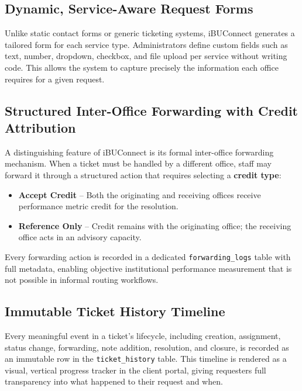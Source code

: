 \documentclass[12pt,a4paper]{article}
\newcommand{\code}[1]{\texttt{#1}}
\begin{document}
\subsection{Dynamic, Service-Aware Request Forms}

Unlike static contact forms or generic ticketing systems, iBUConnect generates a tailored form for each service type. Administrators define custom fields such as text, number, dropdown, checkbox, and file upload per service without writing code. This allows the system to capture precisely the information each office requires for a given request.

\subsection{Structured Inter-Office Forwarding with Credit Attribution}

A distinguishing feature of iBUConnect is its formal inter-office forwarding mechanism. When a ticket must be handled by a different office, staff may forward it through a structured action that requires selecting a \textbf{credit type}:

\begin{itemize}
    \item \textbf{Accept Credit} -- Both the originating and receiving offices receive performance metric credit for the resolution.
    \item \textbf{Reference Only} -- Credit remains with the originating office; the receiving office acts in an advisory capacity.
\end{itemize}

Every forwarding action is recorded in a dedicated \code{forwarding\_logs} table with full metadata, enabling objective institutional performance measurement that is not possible in informal routing workflows.

\subsection{Immutable Ticket History Timeline}

Every meaningful event in a ticket's lifecycle, including creation, assignment, status change, forwarding, note addition, resolution, and closure, is recorded as an immutable row in the \code{ticket\_history} table. This timeline is rendered as a visual, vertical progress tracker in the client portal, giving requesters full transparency into what happened to their request and when.
\end{document}
